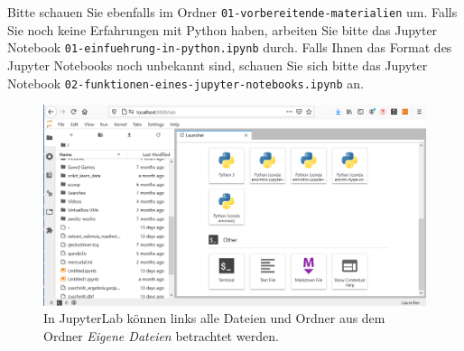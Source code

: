 \documentclass{tufte-handout}
\begin{document}
Bitte schauen Sie ebenfalls im Ordner
\texttt{01-vorbereitende-materialien}
um.
Falls Sie noch keine Erfahrungen mit Python haben, arbeiten Sie bitte das Jupyter Notebook
\texttt{01-einfuehrung-in-python.ipynb}
durch.
Falls Ihnen das Format des Jupyter Notebooks noch unbekannt sind, schauen Sie sich bitte das Jupyter Notebook
\texttt{02-funktionen-eines-jupyter-notebooks.ipynb}
an.


\begin{figure}[h]
  \includegraphics{jupyterlab-running}
  \caption{In JupyterLab können links alle Dateien und Ordner aus dem Ordner \emph{Eigene Dateien} betrachtet werden.}%
\label{fig:start-jupyterlab}
\end{figure}

\doclicenseThis{}
\end{document}
